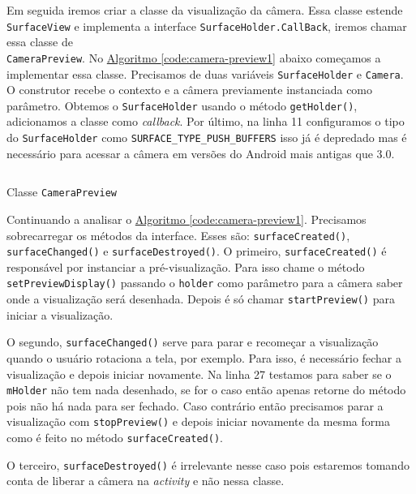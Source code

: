 \documentclass[a4paper,12pt,brazil,oneside]{book}
\begin{document}
\begin{singlespace}
		Em seguida iremos criar a classe da visualização da câmera. Essa classe estende \texttt{SurfaceView} e implementa a interface \texttt{SurfaceHolder.CallBack}, iremos chamar essa classe de \\ \texttt{CameraPreview}. No \hyperref[code:camera-preview1]{Algoritmo \ref*{code:camera-preview1}} abaixo começamos a implementar essa classe. Precisamos de duas variáveis \texttt{SurfaceHolder} e \texttt{Camera}. O construtor recebe o contexto e a câmera previamente instanciada como parâmetro. Obtemos o \texttt{SurfaceHolder} usando o método \texttt{getHolder()}, adicionamos a classe como \emph{callback}. Por último, na linha 11 configuramos o tipo do \texttt{SurfaceHolder} como \texttt{SURFACE\_TYPE\_PUSH\_BUFFERS} isso já é depredado mas é necessário para acessar a câmera em versões do Android mais antigas que 3.0.

		\begin{listing}[H]
		\inputminted[linenos=true,fontsize=\small,frame=lines, framesep=2mm, tabsize=2,numbersep=5pt]{java}{src/api/camera/camerapreview1.java}
		\caption{Classe \texttt{CameraPreview}}
		\label{code:camera-preview1}
		\end{listing} 	

		Continuando a analisar o \hyperref[code:camera-preview1]{Algoritmo \ref*{code:camera-preview1}}. Precisamos sobrecarregar os métodos da interface. Esses são: \texttt{surfaceCreated()}, \texttt{surfaceChanged()} e \texttt{surfaceDestroyed()}. O primeiro, \texttt{surfaceCreated()} é responsável por instanciar a pré-visualização. Para isso chame o método \texttt{setPreviewDisplay()} passando o \texttt{holder} como parâmetro para a câmera saber onde a visualização será desenhada. Depois é só chamar \texttt{startPreview()} para iniciar a visualização. 

	O segundo, \texttt{surfaceChanged()} serve para parar e recomeçar a visualização quando o usuário rotaciona a tela, por exemplo. Para isso, é necessário fechar a visualização e depois iniciar novamente. Na linha 27 testamos para saber se o \texttt{mHolder} não tem nada desenhado, se for o caso então apenas retorne do método pois não há nada para ser fechado. Caso contrário então precisamos parar a visualização com \texttt{stopPreview()} e depois iniciar novamente da mesma forma como é feito no método \texttt{surfaceCreated()}.

	O terceiro, \texttt{surfaceDestroyed()} é irrelevante nesse caso pois estaremos tomando conta de liberar a câmera na \emph{activity} e não nessa classe.


\end{singlespace}
\end{document}
